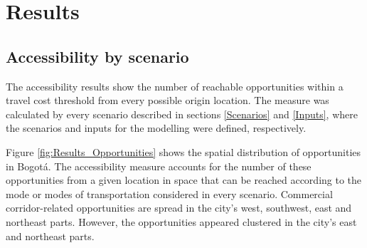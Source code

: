 \documentclass[12pt, a4paper]{report}
\begin{document}
\chapter{Results} \label{Chap5}

\section{Accessibility by scenario}

The accessibility results show the number of reachable opportunities within a travel cost threshold from every possible origin location. The measure was calculated by every scenario described in sections \ref{Scenarios} and \ref{Inputs}, where the scenarios and inputs for the modelling were defined, respectively.



Figure \ref{fig:Results_Opportunities} shows the spatial distribution of opportunities in Bogotá. The accessibility measure accounts for the number of these opportunities from a given location in space that can be reached according to the mode or modes of transportation considered in every scenario. Commercial corridor-related opportunities are spread in the city's west, southwest, east and northeast parts. However, the opportunities appeared clustered in the city's east and northeast parts.



    
\end{document}
